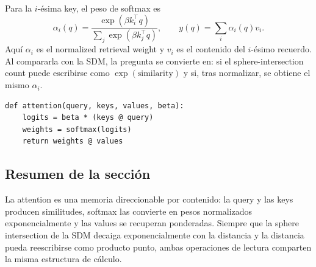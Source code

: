 


Para la $i$-ésima key, el peso de softmax es
$$
\alpha_i(q)=\frac{\exp(\beta k_i^{\top}q)}
{\sum_j\exp(\beta k_j^{\top}q)},
\qquad
y(q)=\sum_i\alpha_i(q)v_i.
$$
Aquí $\alpha_i$ es el normalized retrieval weight y $v_i$ es el contenido del $i$-ésimo recuerdo. Al compararla con la SDM, la pregunta se convierte en: si el sphere-intersection count puede escribirse como $\exp(\text{similarity})$ y si, tras normalizar, se obtiene el mismo $\alpha_i$.

\begin{lstlisting}[caption={Scaled dot-product attention (ilustración con una sola query)}]
def attention(query, keys, values, beta):
    logits = beta * (keys @ query)
    weights = softmax(logits)
    return weights @ values
\end{lstlisting}


\subsection{Resumen de la sección}

La attention es una memoria direccionable por contenido: la query y las keys producen similitudes, softmax las convierte en pesos normalizados exponencialmente y las values se recuperan ponderadas. Siempre que la sphere intersection de la SDM decaiga exponencialmente con la distancia y la distancia pueda reescribirse como producto punto, ambas operaciones de lectura comparten la misma estructura de cálculo.

